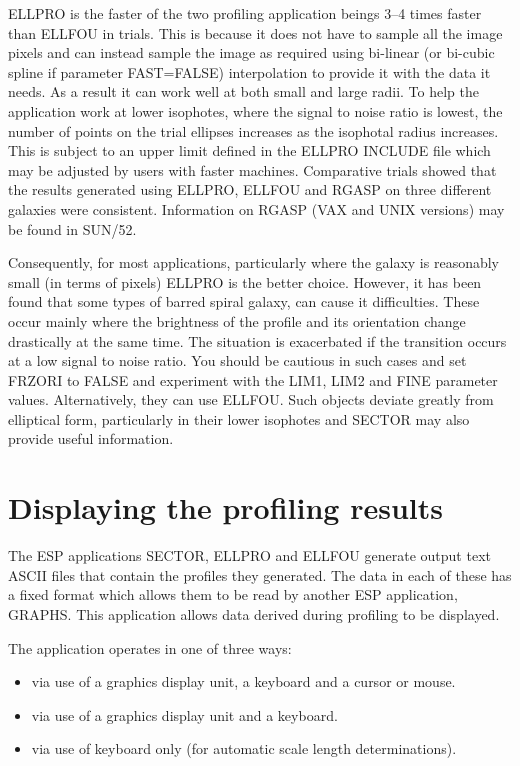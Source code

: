 \documentclass[twoside,11pt]{article}
\newcommand{\xref}[3]{#1}
\begin{document}
ELLPRO is the faster of the two profiling application beings 3--4 times
faster than ELLFOU in trials. This is because it does not have to sample
all the image pixels and can instead sample the image as required
using bi-linear (or bi-cubic spline if parameter FAST=FALSE)
interpolation to provide it with the data it needs. As a result it can work
well at both small and large radii. To help the application work at lower
isophotes, where the signal to noise ratio is lowest, the number of
points on the trial ellipses increases as the isophotal
radius increases. This is subject to an upper limit defined in the ELLPRO
INCLUDE file which may be adjusted by users with faster machines.
Comparative trials showed that the results generated using ELLPRO, ELLFOU
and RGASP on three different galaxies were consistent. Information on
RGASP (VAX and UNIX versions) may be found in \xref{SUN/52}{sun52}{}.

Consequently, for most applications, particularly where the galaxy is
reasonably small (in terms of pixels) ELLPRO is the better choice.
However, it has been found that some types of barred spiral galaxy,
can cause it difficulties. These occur mainly where the brightness of
the profile and its orientation change drastically at the same time.
The situation is exacerbated if the transition occurs at a low signal to
noise ratio. You should be cautious in such cases and set FRZORI to FALSE
and experiment with the LIM1, LIM2 and FINE parameter values. Alternatively,
they can use ELLFOU. Such objects deviate greatly from elliptical form,
particularly in their lower isophotes and SECTOR may also provide useful
information.


\section{Displaying the profiling results}
\label{sec:displaying}

The ESP applications SECTOR, ELLPRO and ELLFOU generate output text
ASCII files that contain the profiles they generated. The data in each of these
has a fixed format which allows them to be read by another ESP application,
GRAPHS. This application allows data derived during profiling to be displayed.

The application operates in one of three ways:

\begin{itemize}
\item via use of a graphics display unit, a keyboard and a cursor or mouse.
\item via use of a graphics display unit and a keyboard.
\item via use of keyboard only (for automatic scale length determinations).
\end{itemize}
\end{document}
